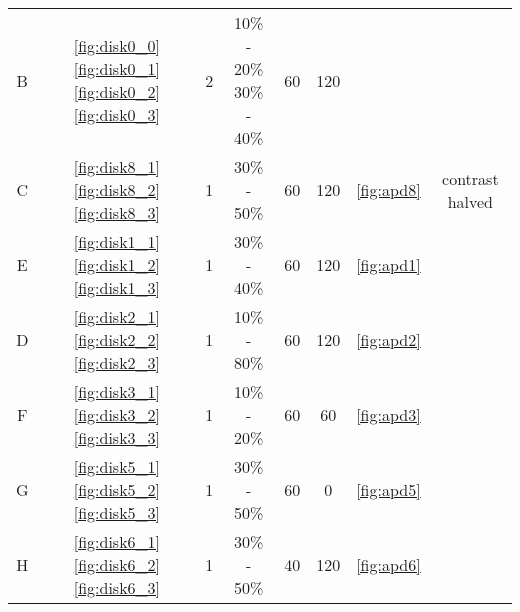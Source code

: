 \begin{table}
{\begin{tabular}{cccccccc}
    B         & \ref{fig:disk0_0} \ref{fig:disk0_1} \ref{fig:disk0_2} \ref{fig:disk0_3}  & 2 & \makecell[t]{10\% - 20\% \\ 
                                                                                           30\% - 40\%} & 60             & 120 \\
    C         & \ref{fig:disk8_1} \ref{fig:disk8_2} \ref{fig:disk8_3} & 1 & 30\% - 50\%                 & 60             & 120 & \autoref{fig:apd8} & contrast halved \\
    E         & \ref{fig:disk1_1} \ref{fig:disk1_2} \ref{fig:disk1_3} & 1 & 30\% - 40\%                 & 60             & 120 & \autoref{fig:apd1}\\
    D         & \ref{fig:disk2_1} \ref{fig:disk2_2} \ref{fig:disk2_3} & 1 & 10\% - 80\%                 & 60             & 120 & \autoref{fig:apd2}\\
    F         & \ref{fig:disk3_1} \ref{fig:disk3_2} \ref{fig:disk3_3} & 1 & 10\% - 20\%                 & 60             & 60  & \autoref{fig:apd3}\\
    G         & \ref{fig:disk5_1} \ref{fig:disk5_2} \ref{fig:disk5_3} & 1 & 30\% - 50\%                 & 60             & 0   & \autoref{fig:apd5}\\
    H         & \ref{fig:disk6_1} \ref{fig:disk6_2} \ref{fig:disk6_3} & 1 & 30\% - 50\%                 & 40             & 120 & \autoref{fig:apd6}\\
    \bottomrule
    \end{tabular}
}
    \label{tab:disks}
\end{table}

